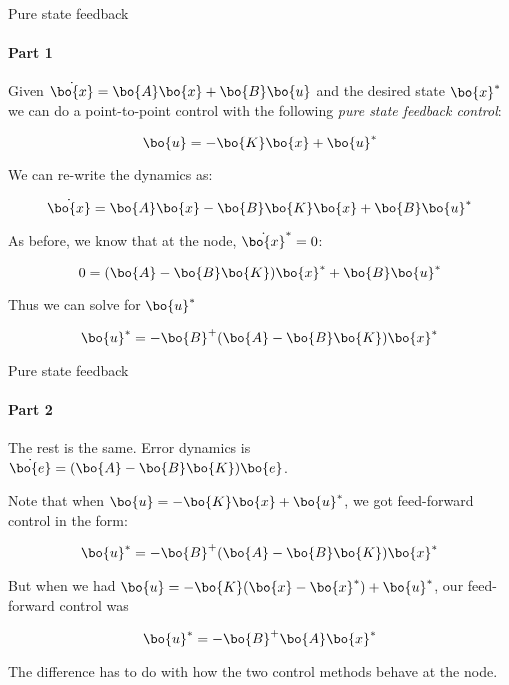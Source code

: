 \documentclass{beamer}
\begin{document}
\begin{frame}{Pure state feedback}
\framesubtitle{Part 1}
\begin{flushleft}

Given $\dot{\bo{x}} = \bo{A}\bo{x} + \bo{B}\bo{u}$ and the desired state $\bo{x}^*$ we can do a point-to-point control with the following \emph{pure state feedback control}:

\begin{equation}
    \bo{u} = -\bo{K}\bo{x} + \bo{u}^*
\end{equation}

We can re-write the dynamics as:

\begin{equation}
    \dot{\bo{x}} = \bo{A}\bo{x} - \bo{B}\bo{K}\bo{x} + \bo{B}\bo{u}^*
\end{equation}

As before, we know that at the node,  $\dot{\bo{x}}^* = 0$:

\begin{equation}
    0 = (\bo{A} - \bo{B}\bo{K})\bo{x}^* + \bo{B}\bo{u}^*
\end{equation}

Thus we can solve for $\bo{u}^*$

\begin{equation}
    \bo{u}^* = -\bo{B}^+(\bo{A} - \bo{B}\bo{K})\bo{x}^*
\end{equation}

\end{flushleft}
\end{frame}



\begin{frame}{Pure state feedback}
\framesubtitle{Part 2}
\begin{flushleft}

The rest is the same. Error dynamics is $\dot{\bo{e}} = (\bo{A} - \bo{B}\bo{K})\bo{e}$.

\bigskip

Note that when $\bo{u} = -\bo{K}\bo{x} + \bo{u}^*$, we got feed-forward control in the form:

\[
    \bo{u}^* = -\bo{B}^+(\bo{A} - \bo{B}\bo{K})\bo{x}^*
\]

\bigskip

But when we had $\bo{u} = -\bo{K}(\bo{x} - \bo{x}^*) + \bo{u}^*$, our feed-forward control was

\[
    \bo{u}^* = -\bo{B}^+\bo{A}\bo{x}^*
\]

\bigskip

The difference has to do with how the two control methods behave at the node.

\end{flushleft}
\end{frame}
\end{document}
